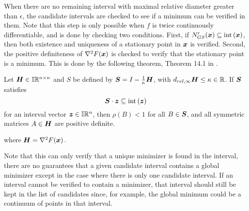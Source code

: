 \documentclass[../global-optimization.tex]{subfiles}
\begin{document}
  When there are no remaining interval with maximal relative diameter greater than $\epsilon$, 
  the candidate intervals are checked to see if a minimum can be verified in them.
  Note that this step is only possible when 
  $f$ is twice continuously differentiable, 
  and is done by checking two conditions.
  First, if $N'_{GS}(\x) \subseteq \Iint(\x)$, 
  then both existence and uniqueness of a stationary point in $\x$ is verified.
  Second, the positive definiteness of $\nabla^2 F(\x)$ is 
  checked to verify that the stationary point is a minimum.
  This is done by the following theorem, Theorem 14.1 in \cite{toolbox-hammer}.

  \begin{theorem}
    Let $\H \in \Iz \Rz^{n \times n}$ and $S$ be defined by $\S = I - \frac{1}{\kappa} \H$, with \linebreak $\dmrel \H \le \kappa \in \Rz$.
    If $\S$ satisfies
    \begin{equation*}
      \S \cdot \z \subseteq \Iint (\z)
    \end{equation*}
    for an interval vector $\z \in \Iz \Rz^n$, then $\rho(B) < 1$ for all $B \in \S$, and all symmetric matrices $A \in \H$ are positive definite.
  \end{theorem}
  where $\H = \nabla^2 F(\x)$.

  Note that this can only verify that a unique minimizer is found in the interval,
  there are no guarantees that a given candidate interval contains 
  a global minimizer except in the case where there is only one candidate interval.
  If an interval cannot be verified to contain a minimizer, 
  that interval should still be kept in the list of candidates since, 
  for example, the global minimum could be a continuum of points in that interval.
\end{document}
